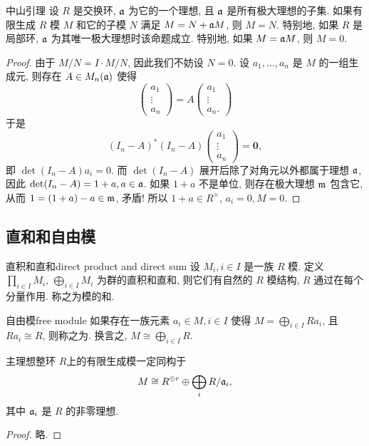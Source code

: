 \begin{proposition}{中山引理}{}
设 $R$ 是交换环, ${\mathfrak{a}}$ 为它的一个理想, 且 ${\mathfrak{a}}$ 是所有极大理想的子集.
如果有限生成 $R$ 模 $M$ 和它的子模 $N$ 满足 $M=N+{\mathfrak{a}} M$, 则 $M=N$. 特别地, 如果 $R$ 是局部环, ${\mathfrak{a}}$ 为其唯一极大理想时该命题成立. 特别地, 如果 $M={\mathfrak{a}} M$, 则 $M=0$.
\end{proposition}
\begin{proof}
由于 $M/N=I\cdot M/N$, 因此我们不妨设 $N=0$. 设 $a_1,\dots,a_n$ 是 $M$ 的一组生成元, 则存在 $A\in M_n({\mathfrak{a}})$ 使得
  \[\begin{pmatrix}
    a_1\\\vdots\\ a_n
  \end{pmatrix}=A\begin{pmatrix}
    a_1\\\vdots\\ a_n.
  \end{pmatrix}\]
于是
  \[(I_n-A)^*(I_n-A)\begin{pmatrix}
    a_1\\\vdots\\ a_n
  \end{pmatrix}=\mathbf{0},\]
即 $\det(I_n-A) a_i=0$. 而 $\det(I_n-A)$ 展开后除了对角元以外都属于理想 ${\mathfrak{a}}$, 因此 $\det(I_n-A)=1+a,a\in{\mathfrak{a}}$. 如果 $1+a$ 不是单位, 则存在极大理想 ${\mathfrak{m}}$ 包含它, 从而 $1=(1+a)-a\in{\mathfrak{m}}$, 矛盾! 所以 $1+a\in R^\times$, $a_i=0,M=0$.
\end{proof}


\subsection{直和和自由模}
\label{subsec:direct_sum_and_free_modules}

\begin{definition}{直积和直和}{direct product and direct sum}
设 $M_i,i\in I$ 是一族 $R$ 模. 定义 $\prod\limits_{i\in I} M_i$, $\bigoplus\limits_{i\in I} M_i$ 为群的直积和直和, 则它们有自然的 $R$ 模结构, $R$ 通过在每个分量作用. 称之为模的和.
\end{definition}

\begin{definition}{自由模}{free module}
如果存在一族元素 $a_i \in M, i\in I$ 使得 $M=\bigoplus\limits_{i\in I} Ra_i$, 且 $Ra_i\cong R$, 则称之为. 换言之, $M\cong \bigoplus\limits_{i\in I} R$.
\end{definition}

\begin{proposition}{}{}
主理想整环 $R$上的有限生成模一定同构于
  \[M\cong R^{\oplus r}\oplus \bigoplus_i R/{\mathfrak{a}}_i,\]
其中 ${\mathfrak{a}}_i$ 是 $R$ 的非零理想.
\end{proposition}
\begin{proof}
略.
\end{proof}

